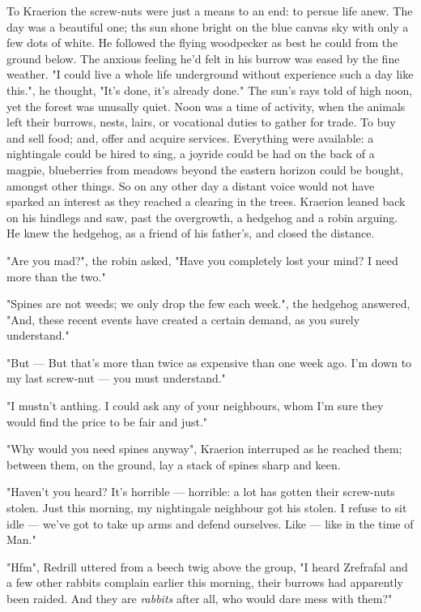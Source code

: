 To Kraerion the screw-nuts were just a means to an end: to persue life anew. The day was a beautiful one; ths sun shone bright on the blue canvas sky with only a few dots of white. He followed the flying woodpecker as best he could from the ground below. The anxious feeling he'd felt in his burrow was eased by the fine weather.
  "I could live a whole life underground without experience such a day like this.", he thought, "It's done, it's already done."
The sun's rays told of high noon, yet the forest was unusally quiet. Noon was a time of activity, when the animals left their burrows, nests, lairs, or vocational duties to gather for trade. To buy and sell food; and, offer and acquire services. Everything were available: a nightingale could be hired to sing, a joyride could be had on the back of a magpie, blueberries from meadows beyond the eastern horizon could be bought, amongst other things.
  So on any other day a distant voice would not have sparked an interest as they reached a clearing in the trees. Kraerion leaned back on his hindlegs and saw, past the overgrowth, a hedgehog and a robin arguing. He knew the hedgehog, as a friend of his father's, and closed the distance.

"Are you mad?", the robin asked, "Have you completely lost your mind? I need more than the two."

"Spines are not weeds; we only drop the few each week.", the hedgehog answered, "And, these recent events have created a certain demand, as you surely understand."

"But — But that's more than twice as expensive than one week ago. I'm down to my last screw-nut — you must understand."

"I mustn't anthing. I could ask any of your neighbours, whom I'm sure they would find the price to be fair and just."

"Why would you need spines anyway", Kraerion interruped as he reached them; between them, on the ground, lay a stack of spines sharp and keen.

"Haven't you heard? It's horrible — horrible: a lot has gotten their screw-nuts stolen. Just this morning, my nightingale neighbour got his stolen. I refuse to sit idle — we've got to take up arms and defend ourselves. Like — like in the time of Man."

"Hfm", Redrill uttered from a beech twig above the group, "I heard Zrefrafal and a few other rabbits complain earlier this morning, their burrows had apparently been raided. And they are {\it rabbits} after all, who would dare mess with them?"

